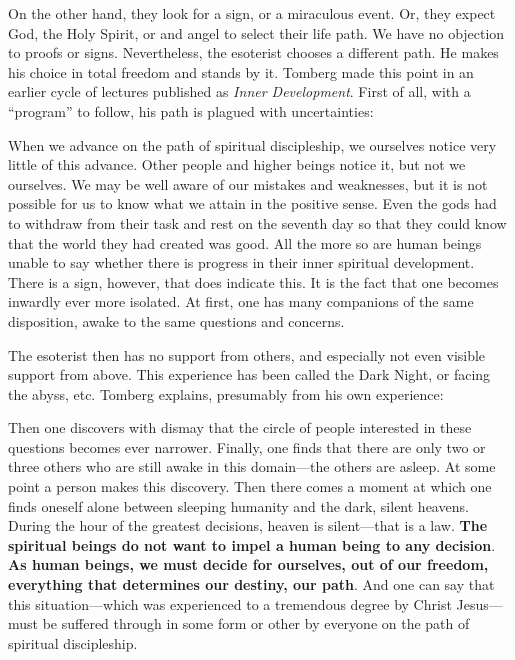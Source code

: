 On the other hand, they look for a sign, or a miraculous event. Or, they expect God, the Holy Spirit, or and angel to select their life path. We have no objection to proofs or signs. Nevertheless, the esoterist chooses a different path. He makes his choice in total freedom and stands by it. Tomberg made this point in an earlier cycle of lectures published as \emph{Inner Development}. First of all, with a ``program'' to follow, his path is plagued with uncertainties:

\begin{quotex}
When we advance on the path of spiritual discipleship, we ourselves notice very little of this advance. Other people and higher beings notice it, but not we ourselves. We may be well aware of our mistakes and weaknesses, but it is not possible for us to know what we attain in the positive sense. Even the gods had to withdraw from their task and rest on the seventh day so that they could know that the world they had created was good. All the more so are human beings unable to say whether there is progress in their inner spiritual development. There is a sign, however, that does indicate this. It is the fact that one becomes inwardly ever more isolated. At first, one has many companions of the same disposition, awake to the same questions and concerns.
\end{quotex}


The esoterist then has no support from others, and especially not even visible support from above. This experience has been called the Dark Night, or facing the abyss, etc. Tomberg explains, presumably from his own experience:

\begin{quotex}
Then one discovers with dismay that the circle of people interested in these questions becomes ever narrower. Finally, one finds that there are only two or three others who are still awake in this domain---the others are asleep. At some point a person makes this discovery. Then there comes a moment at which one finds oneself alone between sleeping humanity and the dark, silent heavens. During the hour of the greatest decisions, heaven is silent---that is a law. \textbf{The spiritual beings do not want to impel a human being to any decision}. \textbf{As human beings, we must decide for ourselves, out of our freedom, everything that determines our destiny, our path}. And one can say that this situation---which was experienced to a tremendous degree by Christ Jesus---must be suffered through in some form or other by everyone on the path of spiritual discipleship.
\end{quotex}



